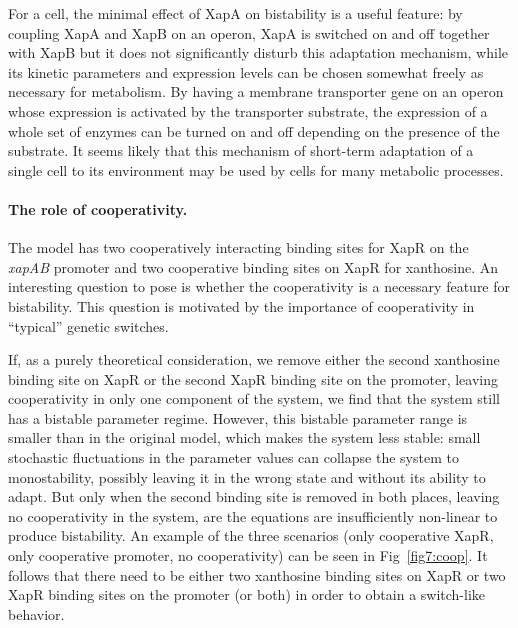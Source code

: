 \documentclass[10pt,letterpaper]{article}
\begin{document}
	For a cell, the minimal effect of XapA on bistability is a useful feature: by coupling XapA and XapB on an
	operon, XapA is switched on and off together with XapB but it does not
	significantly disturb this adaptation mechanism, while its kinetic
	parameters and expression levels can be chosen 
	somewhat freely as necessary for metabolism. By
	having a membrane transporter gene on an operon whose expression is
	activated by the transporter substrate, the expression of a whole set of
	enzymes can be turned on and off depending on the presence of the substrate.
	It seems likely that this mechanism of short-term adaptation of a single cell to
	its environment may be used by cells for many metabolic processes.
	
	\paragraph*{The role of cooperativity.} 
	The model has two cooperatively interacting binding sites for XapR on the
	\emph{xapAB} promoter and two cooperative binding sites on XapR for
	xanthosine. An interesting question to pose is whether the cooperativity is
	a necessary feature for bistability. This question is motivated by the importance of
	cooperativity in ``typical'' genetic switches\cite{Gardner2000,Cherry2000}.
	
	If, as a purely theoretical consideration, we remove either the second
	xanthosine binding site on XapR or the second XapR binding site on the
	promoter, leaving cooperativity in only one component of the system,
	we find that the system still has a bistable parameter regime.
	However, this bistable parameter range is smaller than in the original
	model, which makes the system less stable: small stochastic fluctuations
	in the parameter values can collapse the system to monostability,
	possibly leaving it in the wrong state and without its ability to adapt.
	But only when the second binding site is removed in both places, leaving
	no cooperativity in the system, are the
	equations are insufficiently non-linear to produce bistability. An example
	of the three scenarios (only cooperative XapR, only cooperative promoter, no cooperativity) can be seen in Fig~\ref{fig7:coop}. It follows that
	there need to be either two xanthosine binding sites on XapR or two XapR
	binding sites on the promoter (or both) in order to obtain a switch-like
	behavior. 
	
\end{document}
